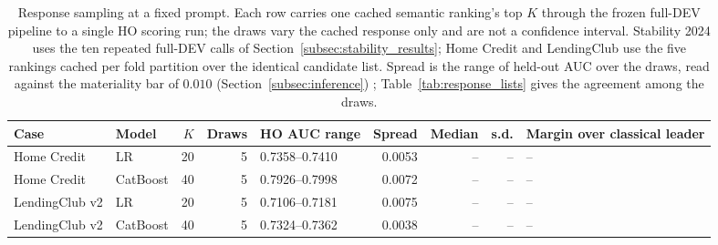 \documentclass[final,5p,twocolumn]{elsarticle}
\newcommand{\Kfeat}{K}
\providecommand{\DIFaddtex}[1]{{\protect\color{blue} \sf #1}} %
\providecommand{\DIFaddFL}[1]{\DIFadd{#1}} %
\providecommand{\DIFaddbeginFL}{} %
\providecommand{\DIFaddendFL}{} %
\providecommand{\DIFdelbeginFL}{} %
\providecommand{\DIFdelendFL}{} %
\providecommand{\DIFadd}[1]{\texorpdfstring{\DIFaddtex{#1}}{#1}} %
\begin{document}
\begin{table}[htbp]
\centering
\footnotesize
\begin{threeparttable}
\caption{Response sampling at a fixed prompt. Each row carries one cached semantic ranking's top $\Kfeat$ through the frozen full-DEV pipeline to a single HO scoring run; the draws vary the cached response only and are not a confidence interval. Stability 2024 uses the ten repeated full-DEV calls of Section~\ref{subsec:stability_results}; Home Credit and LendingClub use the five rankings cached per fold partition over the identical candidate list. Spread is the range of held-out AUC over the draws, read against the materiality bar of $0.010$ (Section~\ref{subsec:inference})\DIFaddbeginFL \DIFaddFL{; Table~\ref{tab:response_lists} gives the agreement among the draws}\DIFaddendFL .}
\label{tab:response_spread}
\setlength{\tabcolsep}{5pt}
\DIFdelbeginFL %
\DIFdelendFL \DIFaddbeginFL \begin{tabular}{@{}llrrlrrrl@{}}
\toprule
Case & Model & $\Kfeat$ & Draws & HO AUC range & Spread & Median & s.d. & Margin over classical leader \\
\midrule
Home Credit & LR & 20 & 5 & 0.7358--0.7410 & 0.0053 & -- & -- & -- \\
Home Credit & CatBoost & 40 & 5 & 0.7926--0.7998 & 0.0072 & -- & -- & -- \\
LendingClub v2 & LR & 20 & 5 & 0.7106--0.7181 & 0.0075 & -- & -- & -- \\
LendingClub v2 & CatBoost & 40 & 5 & 0.7324--0.7362 & 0.0038 & -- & -- & -- \\

\end{tabular}
\end{threeparttable}
\end{table}
\end{document}
